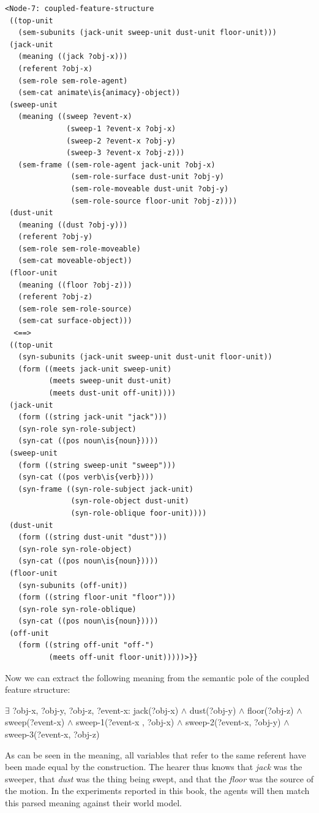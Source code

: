 \ea
\begin{lstlisting}
<Node-7: coupled-feature-structure
 ((top-unit
   (sem-subunits (jack-unit sweep-unit dust-unit floor-unit)))
 (jack-unit
   (meaning ((jack ?obj-x)))
   (referent ?obj-x)
   (sem-role sem-role-agent)
   (sem-cat animate\is{animacy}-object))
 (sweep-unit
   (meaning ((sweep ?event-x)
              (sweep-1 ?event-x ?obj-x)
              (sweep-2 ?event-x ?obj-y)
              (sweep-3 ?event-x ?obj-z)))
   (sem-frame ((sem-role-agent jack-unit ?obj-x)
               (sem-role-surface dust-unit ?obj-y)
               (sem-role-moveable dust-unit ?obj-y)
               (sem-role-source floor-unit ?obj-z))))
 (dust-unit
   (meaning ((dust ?obj-y)))
   (referent ?obj-y)
   (sem-role sem-role-moveable)
   (sem-cat moveable-object))
 (floor-unit
   (meaning ((floor ?obj-z)))
   (referent ?obj-z)
   (sem-role sem-role-source)
   (sem-cat surface-object)))
  <==>
 ((top-unit
   (syn-subunits (jack-unit sweep-unit dust-unit floor-unit))
   (form ((meets jack-unit sweep-unit) 
          (meets sweep-unit dust-unit)
          (meets dust-unit off-unit)))) 
 (jack-unit
   (form ((string jack-unit "jack")))
   (syn-role syn-role-subject)
   (syn-cat ((pos noun\is{noun}))))
 (sweep-unit
   (form ((string sweep-unit "sweep")))
   (syn-cat ((pos verb\is{verb})))
   (syn-frame ((syn-role-subject jack-unit)
               (syn-role-object dust-unit)
               (syn-role-oblique foor-unit))))
 (dust-unit
   (form ((string dust-unit "dust")))
   (syn-role syn-role-object)
   (syn-cat ((pos noun\is{noun}))))
 (floor-unit
   (syn-subunits (off-unit))
   (form ((string floor-unit "floor")))
   (syn-role syn-role-oblique)
   (syn-cat ((pos noun\is{noun}))))
 (off-unit
   (form ((string off-unit "off-") 
          (meets off-unit floor-unit)))))>}}

\end{lstlisting}
\z

Now we can extract the following meaning from the semantic pole of the coupled feature structure:

\ea
$\exists$ ?obj-x, ?obj-y, ?obj-z, ?event-x: jack(?obj-x) $\wedge$ dust(?obj-y) $\wedge$ floor(?obj-z) $\wedge$ sweep(?event-x) $\wedge$ sweep-1(?event-x , ?obj-x) $\wedge$ sweep-2(?event-x, ?obj-y) $\wedge$ sweep-3(?event-x, ?obj-z)
\z

As can be seen in the meaning, all variables that refer to the same referent have been made equal by the construction. The hearer thus knows that {\em jack} was the sweeper, that {\em dust} was the thing being swept, and that the {\em floor} was the source of the motion. In the experiments reported in this book, the agents will then match this parsed meaning against their world model.

